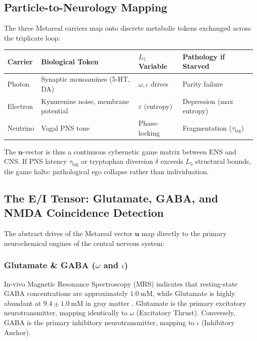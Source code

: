 \subsection{Particle-to-Neurology Mapping}

\begin{hypothesis}
The three Metareal carriers map onto discrete metabolic tokens exchanged across the triplicate loop:

\begin{center}
\begin{tabular}{@{}llll@{}}
\toprule
\textbf{Carrier} & \textbf{Biological Token} & \textbf{$L_5$ Variable} & \textbf{Pathology if Starved} \\
\midrule
Photon   & Synaptic monoamines (5-HT, DA) & $\omega, \iota$ drives & Parity failure \\
Electron & Kynurenine noise, membrane potential & $\varepsilon$ (entropy) & Depression (max entropy) \\
Neutrino & Vagal PNS tone & Phase-locking & Fragmentation ($\tau_{\text{lag}}$) \\
\bottomrule
\end{tabular}
\end{center}

The $\mathbf{u}$-vector is thus a continuous cybernetic game matrix between ENS and CNS. If PNS latency $\tau_{\text{lag}}$ or tryptophan diversion $\delta$ exceeds $L_5$ structural bounds, the game halts: pathological ego collapse rather than individuation.
\end{hypothesis}

\subsection{The E/I Tensor: Glutamate, GABA, and NMDA Coincidence Detection}

The abstract drives of the Metareal vector $\mathbf{u}$ map directly to the primary neurochemical engines of the central nervous system:

\subsubsection{Glutamate \& GABA (\texorpdfstring{$\omega$ and $\iota$}{\omega and \iota})}
In-vivo Magnetic Resonance Spectroscopy (MRS) indicates that resting-state GABA concentrations are approximately $1.0\:\mathrm{mM}$, while Glutamate is highly abundant at $9.4 \pm 1.0\:\mathrm{mM}$ in gray matter \cite{mrs_glutamate}. Glutamate is the primary excitatory neurotransmitter, mapping identically to $\omega$ (Excitatory Thrust). Conversely, GABA is the primary inhibitory neurotransmitter, mapping to $\iota$ (Inhibitory Anchor). 

